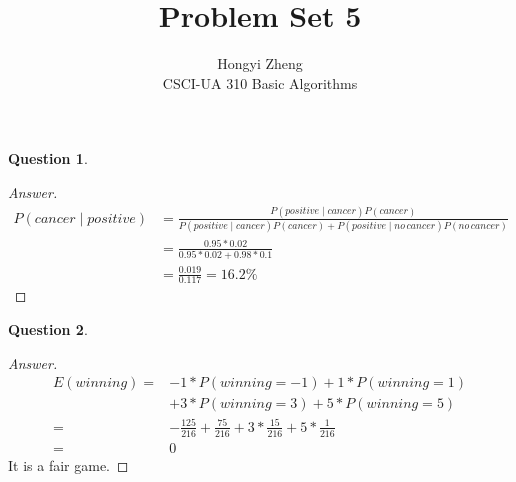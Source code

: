 \documentclass{article}
\title{Problem Set 5}
\author{%
    Hongyi Zheng
\\  CSCI-UA 310 Basic Algorithms
}
\theoremstyle{plain}
\newtheorem{question}{Question}
\newenvironment{answer}[1][Answer]
    {\begin{proof}[#1]{$ $}\renewcommand\qedsymbol{$\vartriangle$}}
    {\end{proof}}
\begin{document}
\maketitle


\begin{question}
\end{question}
\begin{answer}
    \begin{equation*}
        \begin{aligned}
            P(cancer \mid positive) &= \frac{P(positive \mid cancer)P(cancer)}{P(positive \mid cancer)P(cancer) + P(positive \mid no\,cancer)P(no\,cancer)} \\
            &= \frac{0.95 * 0.02}{0.95 * 0.02 + 0.98 * 0.1} \\
            &= \frac{0.019}{0.117} = 16.2\%
        \end{aligned}
    \end{equation*}
\end{answer}

\begin{question}
\end{question}

\begin{answer}
     \begin{equation*}
         \begin{aligned}
             E(winning) =& -1 * P(winning = -1) + 1 * P(winning = 1) \\
             &+ 3 * P(winning = 3) + 5 * P(winning = 5)\\
             =& -\frac{125}{216} + \frac{75}{216} + 3 * \frac{15}{216} + 5 * \frac{1}{216} \\
             =& 0
         \end{aligned}
     \end{equation*}
     It is a fair game.
\end{answer}
\end{document}
